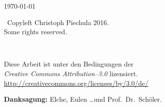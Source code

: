 \begin{titlepage}
\begin{center}
\vfill

{\large \today}
\end{center}
\end{titlepage}

\nopagecolor

\newpage

\thispagestyle{empty}
\vspace*{0in}
\begin{center}
  {\Large{}}\ Copyleft Christoph Piechula 2016. \\
  Some rights reserved. \\
  \vspace{1in}
  \begin{minipage}[c]{0.2\linewidth}
    \hfill {\Huge \ccLogo~\ccAttribution}
  \end{minipage}
  \hspace{0.1cm}
  \begin{minipage}[c]{0.7\linewidth}
    Diese Arbeit ist unter den Bedingungen der \\
    \textit{Creative Commons Attribution--3.0} lizensiert. \\
    \url{http://creativecommons.org/licenses/by/3.0/de/}
  \end{minipage}
\end{center}
\vspace{6cm}
\textbf{Danksagung:} Elche, Eulen \dots und Prof.\ Dr.\ Schöler.
\clearpage 

\newpage
